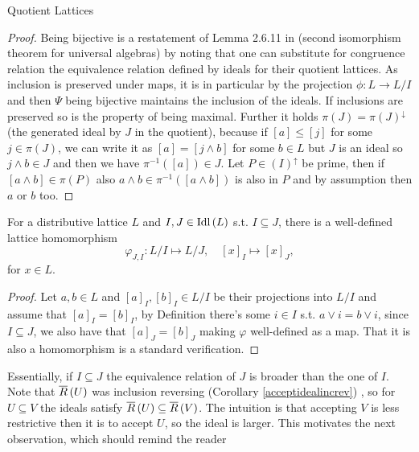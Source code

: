 \begin{subsection}{Quotient Lattices}
\begin{proof}
        Being bijective is a restatement of Lemma 2.6.11 in \cite{genlattheorygraetzer} (second isomorphism theorem for universal algebras) by noting that one can substitute 
        for congruence relation the equivalence relation defined by ideals for their quotient lattices.
        As inclusion is preserved under maps, it is in particular by the projection \( \phi : L \to L / I \)
        and then \( \Psi \) being bijective maintains the inclusion of the ideals.
        If inclusions are preserved so is the property of being maximal.
        Further it holds \( \pi(J) = \pi(J)^\downarrow \) (the generated ideal by \(J\) in the quotient), because 
        if \( [a] \leq [j] \) for some \( j \in \pi(J) \), we can write it as \( [a] = [j \wedge b] \) for some \( b \in L \)
        but \( J \) is an ideal so \( j \wedge b \in J \) and then we have \( \pi^{-1}([a]) \in J \).
        Let \( P \in (I)^\uparrow \) be prime, then if \( [a \wedge b] \in \pi(P) \) also \( a \wedge b \in \pi^{-1}([a \wedge b]) \)
        is also in \( P \) and by assumption then \( a \) or \( b \) too.
    \end{proof}
    \begin{proposition} \label{quotientprojectionlattice}
        For a distributive lattice \( L \) and \( I, J \in \text{Idl}\left (L \right) \) s.t. \( I \subseteq J \), there is a well-defined lattice homomorphism
        \[
            \varphi_{J,I} : L / I  \mapsto L / J, \quad [x]_{I} \mapsto [x]_{J},
        \]
        for \( x \in L \).
    \end{proposition}
    \begin{proof}
        Let \( a,b \in L \) and \( [a]_{I}, [b]_{I} \in L / I \) be their projections into \( L / I \) and assume that \( [a]_{I} = [b]_{I} \),
        by Definition there's some \( i \in I \) s.t. \( a \vee i = b \vee i \), since \( I \subseteq J \), we also have that \( [a]_{J} = [b]_{J} \)
        making \( \varphi \) well-defined as a map. That it is also a homomorphism is a standard verification.
    \end{proof}
    Essentially, if \( I \subseteq J \) the equivalence relation of \( J \) is broader than the one of \( I \). Note that 
    \( \overline{R}\left (U \right) \) was inclusion reversing (Corollary \ref{acceptidealincrev}) , so for \( U \subseteq V \) 
    the ideals satisfy \( \overline{R}\left (U \right) \subseteq \overline{R}\left (V \right) \). The intuition is that accepting \( V \) is less 
    restrictive then it is to accept \( U \), so the ideal is larger. This motivates the next observation, which should remind the reader 

\end{subsection}
